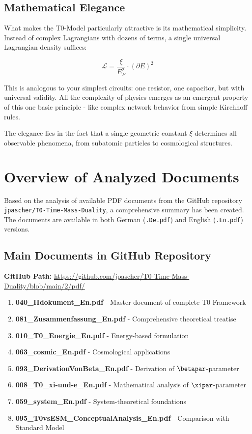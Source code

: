 \subsection{Mathematical Elegance}

What makes the T0-Model particularly attractive is its mathematical simplicity. Instead of complex Lagrangians with dozens of terms, a single universal Lagrangian density suffices:

$$\mathcal{L} = \frac{\xi}{E_P^2} \cdot (\partial E)^2$$

This is analogous to your simplest circuits: one resistor, one capacitor, but with universal validity. All the complexity of physics emerges as an emergent property of this one basic principle - like complex network behavior from simple Kirchhoff rules.

The elegance lies in the fact that a single geometric constant $\xi$ determines all observable phenomena, from subatomic particles to cosmological structures.	
\section{Overview of Analyzed Documents}

Based on the analysis of available PDF documents from the GitHub repository \texttt{jpascher/T0-Time-Mass-Duality}, a comprehensive summary has been created. The documents are available in both German (\texttt{.De.pdf}) and English (\texttt{.En.pdf}) versions.

\subsection{Main Documents in GitHub Repository}

\textbf{GitHub Path:} \url{https://github.com/jpascher/T0-Time-Mass-Duality/blob/main/2/pdf/}

\begin{enumerate}
	\item \textbf{040\_Hdokument\_En.pdf} - Master document of complete T0-Framework
	\item \textbf{081\_Zusammenfassung\_En.pdf} - Comprehensive theoretical treatise
	\item \textbf{010\_T0\_Energie\_En.pdf} - Energy-based formulation
	\item \textbf{063\_cosmic\_En.pdf} - Cosmological applications
	\item \textbf{093\_DerivationVonBeta\_En.pdf} - Derivation of $\betapar$-parameter
	\item \textbf{008\_T0\_xi-und-e\_En.pdf} - Mathematical analysis of $\xipar$-parameter
	\item \textbf{059\_system\_En.pdf} - System-theoretical foundations
	\item \textbf{095\_T0vsESM\_ConceptualAnalysis\_En.pdf} - Comparison with Standard Model
\end{enumerate}

